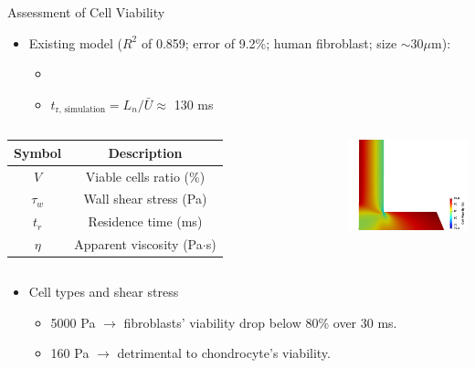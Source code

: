 \begin{frame}{Assessment of Cell Viability}%
\begin{itemize}
    \item Existing model ($R^2$ of 0.859; error of 9.2\%; human fibroblast; size $\sim 30 \mu$m)\footnotemark:
    \begin{itemize}
        \item {}\vspace{1mm}
        \item $t_{\text{r, simulation}} = L_n / \bar{U} \approx$ 130 ms
    \end{itemize}
\end{itemize}
\vspace{-3mm}
\begin{columns}
\centering
\begin{table}
\begin{tabular}{ c | c }
Symbol & Description \\
\hline \hline
$V$ & Viable cells ratio (\%)\\
$\tau_w$ & Wall shear stress (Pa)\\
$t_r$ & Residence time (ms)\\
$\eta$ & Apparent viscosity (Pa$\cdot$s)
\end{tabular}
\end{table}
\centering
\includegraphics[trim = 0mm 0mm 0mm 0mm, clip, width=1.95in]{images/cell_viability_90_25C.png}
\end{columns}
\vspace{-3mm}
\begin{itemize}
    \item Cell types and shear stress\footnotemark
    \begin{itemize}
        \item 5000 Pa $\rightarrow$ fibroblasts’ viability drop below 80\% over 30 ms.
        \item 160 Pa $\rightarrow$ detrimental to chondrocyte's viability.
        \end{itemize}
\end{itemize}
\addtocounter{footnote}{-2}

\end{frame}

